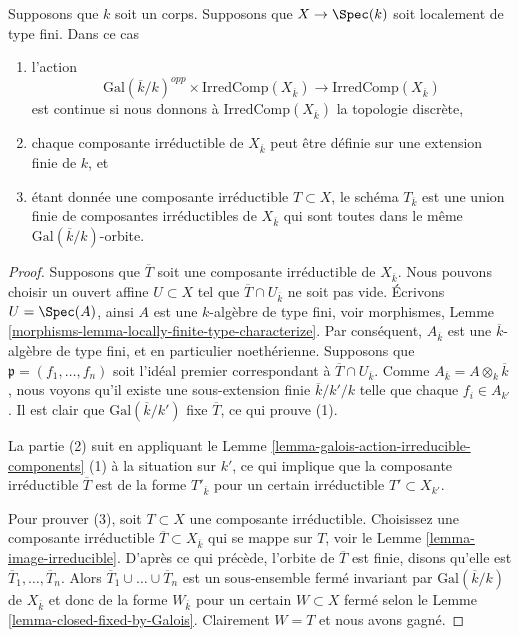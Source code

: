 \begin{lemma}
\label{lemma-galois-action-irreducible-components-locally-finite-type}
Supposons que $k$ soit un corps.
Supposons que $X \to \Spec(k)$ soit
localement de type fini. Dans ce cas
\begin{enumerate}
\item l'action
$$
\text{Gal}(\overline{k}/k)^{opp} \times \text{IrredComp}(X_{\overline{k}})
\longrightarrow
\text{IrredComp}(X_{\overline{k}})
$$
est continue si nous donnons à
$\text{IrredComp}(X_{\overline{k}})$ la topologie
discrète, \item chaque composante irréductible de
$X_{\overline{k}}$ peut être définie sur une extension finie
de $k$, et \item étant donnée une composante irréductible
$T \subset X$, le schéma $T_{\overline{k}}$ est une union
finie de composantes irréductibles de $X_{\overline{k}}$ qui
sont toutes dans le même $\text{Gal}(\overline{k}/k)$-orbite.
\end{enumerate}
\end{lemma}

\begin{proof}
Supposons que $\overline{T}$ soit une composante irréductible
de $X_{\overline{k}}$. Nous pouvons choisir un ouvert affine $U
\subset X$ tel que $\overline{T} \cap U_{\overline{k}}$ ne soit
pas vide. Écrivons $U = \Spec(A)$, ainsi $A$ est une
$k$-algèbre de type fini, voir morphismes, Lemme
\ref{morphisms-lemma-locally-finite-type-characterize}. Par
conséquent, $A_{\overline{k}}$ est une $\overline{k}$-algèbre de
type fini, et en particulier noethérienne. Supposons que $\mathfrak
p = (f_1, \ldots, f_n)$ soit l'idéal premier correspondant à
$\overline{T} \cap U_{\overline{k}}$. Comme $A_{\overline{k}} = A
\otimes_k \overline{k}$, nous voyons qu'il existe une sous-extension
finie $\overline{k}/k'/k$ telle que chaque $f_i \in A_{k'}$. Il est clair
que $\text{Gal}(\overline{k}/k')$ fixe $\overline{T}$, ce qui prouve (1).

\medskip\noindent
La partie (2) suit en appliquant le Lemme
\ref{lemma-galois-action-irreducible-components} (1) à
la situation sur $k'$, ce qui implique que la composante
irréductible $\overline{T}$ est de la forme
$T'_{\overline{k}}$ pour un certain irréductible $T' \subset X_{k'}$.

\medskip\noindent
Pour prouver (3), soit $T \subset X$ une composante
irréductible. Choisissez une composante irréductible
$\overline{T} \subset X_{\overline{k}}$ qui se mappe sur
$T$, voir le Lemme \ref{lemma-image-irreducible}. D'après ce
qui précède, l'orbite de $\overline{T}$ est finie, disons
qu'elle est $\overline{T}_1, \ldots, \overline{T}_n$. Alors
$\overline{T}_1 \cup \ldots \cup \overline{T}_n$ est un
sous-ensemble fermé invariant par $\text{Gal}(\overline{k}/k)$
de $X_{\overline{k}}$ et donc de la forme $W_{\overline{k}}$
pour un certain $W \subset X$ fermé selon le Lemme
\ref{lemma-closed-fixed-by-Galois}. Clairement $W = T$ et nous avons gagné.
\end{proof}

